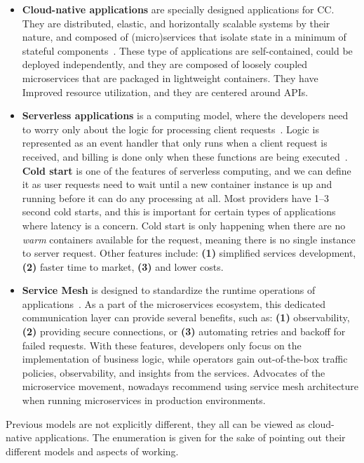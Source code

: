 \begin{itemize}
	\item \textbf{Cloud-native applications} are specially designed applications for CC. They are distributed, elastic, and horizontally scalable systems by their nature, and composed of (micro)services that isolate state in a minimum of stateful components~\cite{KratzkeQ17}. These type of applications are self-contained, could be deployed independently, and they are composed of loosely coupled microservices that are packaged in lightweight containers. They have Improved resource utilization, and they are centered around APIs.
	\item \textbf{Serverless applications} is a computing model, where the developers need to worry only about the logic for processing client requests~\cite{AdzicC17}. Logic is represented as an event handler that only runs when a client request is received, and billing is done only when these functions are being executed~\cite{AdzicC17}. \textbf{Cold start} is one of the features of serverless computing, and we can define it as user requests need to wait until a new container instance is up and running before it can do any processing at all. Most providers have 1–3 second cold starts, and this is important for certain types of applications where latency is a concern. Cold start is only happening when there are no \textit{warm} containers available for the request, meaning there is no single instance to server request. Other features include: \textbf{(1)} simplified services development, \textbf{(2)} faster time to market, \textbf{(3)} and lower costs.
	\item \textbf{Service Mesh} is designed to standardize the runtime operations of applications~\cite{LiLGZH19}. As a part of the microservices ecosystem, this dedicated communication layer can provide several benefits, such as: \textbf{(1)} observability, \textbf{(2)} providing secure connections, or \textbf{(3)} automating retries and backoff for failed requests. With these features, developers only focus on the implementation of business logic, while operators gain out-of-the-box traffic policies, observability, and insights from the services. Advocates of the microservice movement, nowadays recommend using service mesh architecture when running microservices in production environments.
\end{itemize}

\noindent
Previous models are not explicitly different, they all can be viewed as cloud-native applications. The enumeration is given for the sake of pointing out their different models and aspects of working.

